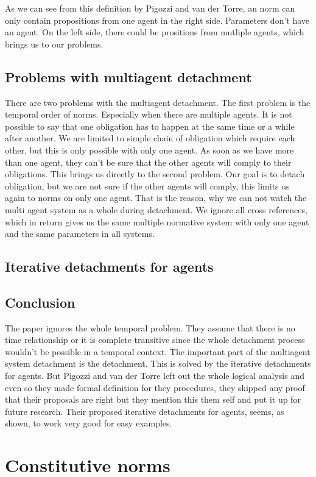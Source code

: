 \documentclass{article}
\begin{document}
As we can see from this definition by Pigozzi and van der Torre, an norm can only contain propositions from one agent in the right side. Parameters don't have an agent. On the left side, there could be prositions from mutliple agents, which brings us to our problems.
\subsection{Problems with multiagent detachment}
There are two problems with the multiagent detachment. The first problem is the temporal order of norms. Especially when there are multiple agents. It is not possible to say that one obligation has to happen at the same time or a while after another. We are limited to simple chain of obligation which require each other, but this is only possible with only one agent. As soon as we have more than one agent, they can't be sure that the other agents will comply to their obligations. This brings us directly to the second problem. Our goal is to detach obligation, but we are not sure if the other agents will comply, this limits us again to norms on only one agent. That is the reason, why we can not watch the multi agent system as a whole during detachment. We ignore all cross references, which in return gives us the same multiple normative system with only one agent and the same parameters in all systems. 
\subsection{Iterative detachments for agents}
\subsection{Conclusion}
The paper ignores the whole temporal problem. They assume that there is no time relationship or it is complete transitive since the whole detachment process wouldn't be possible in a temporal context.
The important part of the multiagent system detachment is the detachment. This is solved by the iterative detachments for agents. But Pigozzi and van der Torre left out the whole logical analysis and even so they made formal definition for they procedures, they skipped any proof that their proposals are right but they mention this them self and put it up for future research. Their proposed iterative detachments for agents, seems, as shown, to work very good for easy examples.
\section{Constitutive norms}
\end{document}
